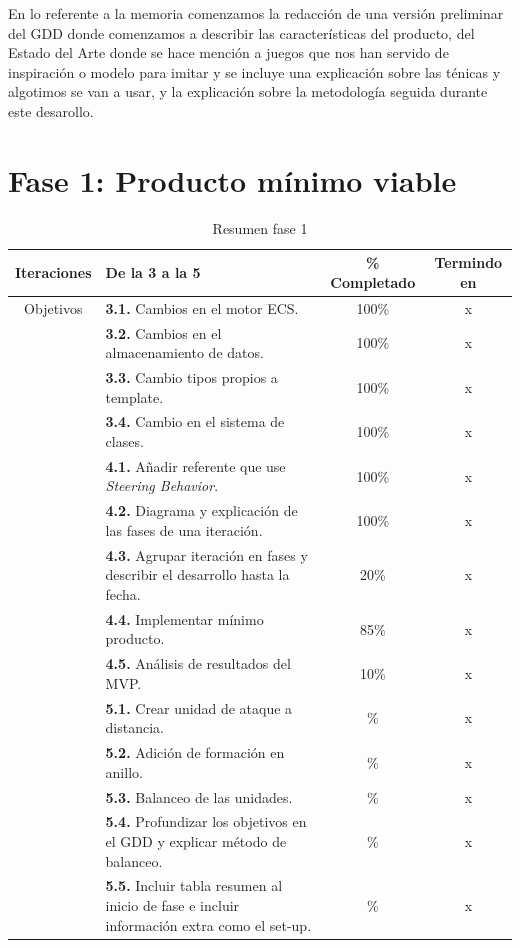 En lo referente a la memoria comenzamos la redacción de una versión preliminar del \ac{GDD}
donde comenzamos a describir las características del producto, del Estado del Arte donde se hace
mención a juegos que nos han servido de inspiración o modelo para imitar y se incluye una explicación
sobre las ténicas y algotimos se van a usar, y la explicación sobre la metodología seguida durante
este desarollo. 

\newpage

\section{Fase 1: Producto mínimo viable}

\begin{table}[ht]
\begin{center}
\begin{tabular}{|c|p{7cm}|c|c|}
\hline
Iteraciones & De la 3 a la 5                                               & \% Completado & Termindo en \\ 
\hline
Objetivos   &   \textbf{3.1.} Cambios en el motor ECS.                     & 100\% & x \\
		    &   \textbf{3.2.} Cambios en el almacenamiento de datos.       & 100\% & x \\ 
		    &	\textbf{3.3.} Cambio tipos propios a template.             & 100\% & x \\ 
		    &	\textbf{3.4.} Cambio en el sistema de clases.              & 100\% & x \\
	\cmidrule{2-2}
		    &	\textbf{4.1.} Añadir referente que use 
		    					\textit{Steering Behavior}.                & 100\% & x \\
		    &	\textbf{4.2.} Diagrama y explicación de las fases de 
		    					una iteración.                             & 100\% & x \\
            &   \textbf{4.3.} Agrupar iteración en fases y describir el
            					desarrollo hasta la fecha.                 & 20\%  & x \\
            &   \textbf{4.4.} Implementar mínimo producto.                 & 85\%  & x \\
            &   \textbf{4.5.} Análisis de resultados del MVP.              & 10\%  & x \\
	\cmidrule{2-2}
            &   \textbf{5.1.} Crear unidad de ataque a distancia.          & \% & x \\
		    &   \textbf{5.2.} Adición de formación en anillo.              & \% & x \\ 
		    &	\textbf{5.3.} Balanceo de las unidades.                    & \% & x \\ 
		    &	\textbf{5.4.} Profundizar los objetivos en el GDD y 
		    					explicar método de balanceo.               & \% & x \\ 
		    &	\textbf{5.5.} Incluir tabla resumen al inicio de fase
		    					e incluir información extra como el set-up.& \% & x \\
\hline
\end{tabular}
\caption{Resumen fase 1}
\end{center}
\end{table}

